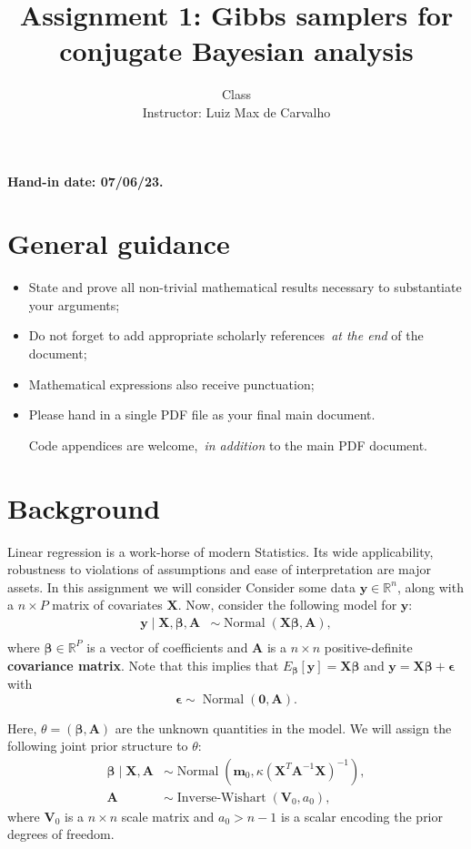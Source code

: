 \documentclass[a4paper,10pt, notitlepage]{report}
\title{Assignment 1: Gibbs samplers for conjugate Bayesian analysis}
\author{Class \\ Instructor: Luiz Max de Carvalho}
\newcommand{\bX}{ \boldsymbol{X}} %
\newcommand{\by}{ \boldsymbol{y} } %
\newcommand{\bb}{ \boldsymbol{\beta} }
\newcommand{\ba}{ \boldsymbol{A} }
\begin{document}
\maketitle

\textbf{Hand-in date: 07/06/23.}

\section*{General guidance}
\begin{itemize}
 \item State and prove all non-trivial mathematical results necessary to substantiate your arguments;
 \item Do not forget to add appropriate scholarly references~\textit{at the end} of the document;
 \item Mathematical expressions also receive punctuation;
 \item Please hand in a single PDF file as your final main document.
 
 Code appendices are welcome,~\textit{in addition} to the main PDF document.
 \end{itemize}

\newpage

\section*{Background}
Linear regression is a work-horse of modern Statistics.
Its wide applicability, robustness to violations of assumptions and ease of interpretation are major assets. 
In this assignment we will consider 
Consider some data $\by \in \mathbb{R}^n$, along with a $n \times P$ matrix of covariates $\boldsymbol{X}$.
Now, consider the following model for $\boldsymbol{y}$:
\begin{align*}
    \by \mid \bX, \bb, \ba & \sim \operatorname{Normal}\left(\bX \bb, \ba\right),\\
\end{align*}
where $\bb \in \mathbb{R}^P$ is a vector of coefficients and  $\ba$ is a $n \times n$ positive-definite \textbf{covariance matrix}.
Note that this implies that $E_{\boldsymbol{\beta}}[\by] = \bX\bb$ and $\by = \bX\bb + \boldsymbol{\epsilon}$ with
\begin{equation*}
    \boldsymbol{\epsilon} \sim \operatorname{Normal}(\boldsymbol{0}, \ba).
\end{equation*}

Here, $\theta = (\bb, \ba)$ are the unknown quantities in the model.
We will assign the following joint prior structure to $\theta$:
\begin{align*}
        \bb \mid \bX, \ba & \sim \operatorname{Normal}\left(\boldsymbol{m}_0, \kappa \left(\bX^T \ba^{-1} \bX \right)^{-1}\right),\\
    \ba &\sim \operatorname{Inverse-Wishart}(\boldsymbol{V}_0, a_0),
\end{align*}
where $\boldsymbol{V}_0$ is a $n \times n$ scale matrix and $a_0 >  n - 1$ is a scalar encoding the prior degrees of freedom.
\end{document}
